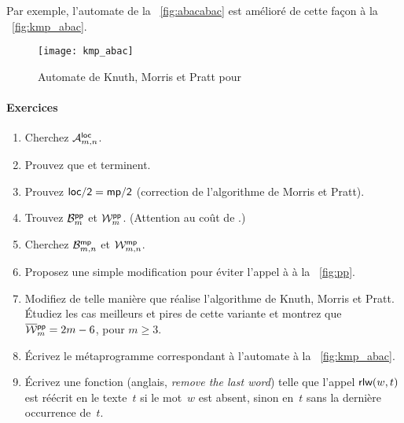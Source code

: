 Par exemple, l'automate de la \fig~\vref{fig:abacabac} est amélioré de
cette façon à la \fig~\vref{fig:kmp_abac}.
\begin{figure}
\centering
\texttt{[image: kmp\_abac]}
\caption{Automate de Knuth, Morris et Pratt pour }
\label{fig:kmp_abac}
\end{figure}

\paragraph{Exercices}

\begin{enumerate}

  \item Cherchez \(\M{\fun{loc}}{m,n}\).

  \item Prouvez que  et  terminent.

  \item Prouvez \(\fun{loc/2} = \fun{mp/2}\) (correction de
    l'algorithme de Morris et Pratt).

  \item Trouvez \(\B{\fun{pp}}{m}\) et \(\W{\fun{pp}}{m}\). (Attention
    au coût de .)

  \item Cherchez \(\B{\fun{mp}}{m,n}\) et \(\W{\fun{mp}}{m,n}\).

  \item Proposez une simple modification pour éviter l'appel à
     à la \fig~\vref{fig:pp}.\label{factoring_trick}

  \item Modifiez  de telle manière que  réalise
    l'algorithme de Knuth, Morris et Pratt. Étudiez les cas meilleurs
    et pires de cette variante et montrez que \(\OW{\fun{pp}}{m} =
    2m-6\), pour \(m \geqslant 3\).

  \item Écrivez le métaprogramme correspondant à l'automate à la
    \fig~\vref{fig:kmp_abac}.

  \item Écrivez une fonction 
    (anglais, \emph{remove the last word}) telle que l'appel
    \(\fun{rlw}(w,t)\) est réécrit en le texte~\(t\) si le mot~\(w\)
    est absent, sinon en~\(t\) sans la dernière occurrence de~\(t\).

\end{enumerate}
